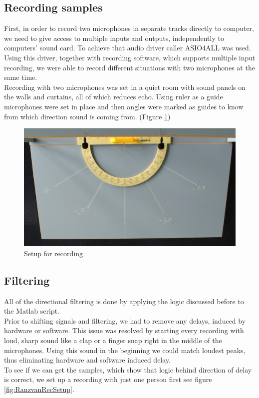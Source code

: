 \subsection{Recording samples}
First, in order to record two microphones in separate tracks directly to computer, we need to give access to multiple inputs and outputs,  
independently to computers' sound card. To achieve that audio driver caller ASIO4ALL was used. Using this driver, together with recording software, 
which supports multiple input recording, we were able to record different situations with two microphones at the same time. \\
Recording with two microphones was set in a quiet room with sound panels on the walls and curtains, all of 
which reduces echo. Using ruler as a guide microphones were set in place and then angles were marked as 
guides to know from which direction sound is coming from. (Figure \ref{fig:recSetup}) 
\begin{figure}[htp]
	\centering
	\includegraphics[width=1\textwidth]{Illustrations/JustSetup.jpg}
	\caption{Setup for recording}
	\label{fig:recSetup}
\end{figure}

\subsection{Filtering}
All of the directional filtering is done by applying the logic discussed before to the Matlab script.\\
Prior to shifting signals and filtering, we had to remove any delays, induced by hardware or software. This 
issue was resolved by starting every recording with loud, sharp sound like a clap or a finger snap right in 
the middle of the microphones. Using this sound in the beginning we could match loudest peaks, thus 
eliminating hardware and software induced delay. \\
To see if we can get the samples, which show that logic behind direction of delay is correct, we set up a 
recording with just one person first see figure \ref{fig:RanzvanRecSetup}.\\

